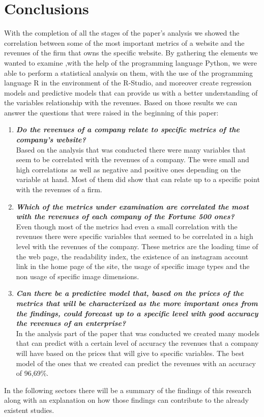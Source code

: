 \documentclass{book}
\begin{document}
\chapter{Conclusions}
With the completion of all the stages of the paper's analysis we showed the correlation between some of the most important metrics of a website and the revenues of the firm that owns the specific website. By gathering the elements we wanted to examine ,with the help of the programming language Python, we were able to perform a statistical analysis on them, with the use of the programming language R in the environment of the R-Studio, and moreover create regression models and predictive models that can provide us with a better understanding of the variables relationship with the revenues. Based on those results we can answer the questions that were raised in the beginning of this paper:
\begin{enumerate}
\item \textbf{\textit{Do the revenues of a company relate to specific metrics of the company's website?}}\\
Based on the analysis that was conducted there were many variables that seem to be correlated with the revenues of a company. The were small and high correlations as well as negative and positive ones depending on the variable at hand. Most of them did show that can relate up to a specific point with the revenues of a firm.
\item \textbf{\textit{Which of the metrics under examination are correlated the most with the revenues of each company of the Fortune 500 ones?}}\\
Even though most of the metrics had even a small correlation with the revenues there were specific variables that seemed to be correlated in a high level with the revenues of the company. These metrics are the loading time of the web page, the readability index, the existence of an instagram account link in the home page of the site, the usage of specific image types and the non usage of specific image dimensions.
\item \textbf{\textit{Can there be a predictive model that, based on the prices of the metrics that will be characterized as the more important ones from the findings, could forecast up to a specific level with good accuracy the revenues of an enterprise?}}\\
In the analysis part of the paper that was conducted we created many models that can predict with a certain level of accuracy the revenues that a company will have based on the prices that will give to specific variables. The best model of the ones that we created can predict the revenues with an accuracy of 96,69\%.
\end{enumerate}
In the following sectors there will be a summary of the findings of this research along with an explanation on how those findings can contribute to the already existent studies.
\end{document}
